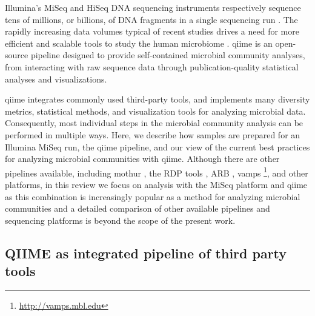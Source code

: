 Illumina's MiSeq and HiSeq DNA sequencing instruments respectively sequence tens of millions,
or billions, of DNA fragments in a single sequencing run \cite{Kuczynski2011}. The rapidly
increasing data volumes typical of recent studies drives a need for more efficient and scalable
tools to study the human microbiome \cite{Gonzalez2012}. \gls{qiime} \cite{Caporaso2010} is an
open-source pipeline designed to provide self-contained microbial community analyses, from interacting
with raw sequence data through publication-quality statistical analyses and visualizations.

\gls{qiime} integrates commonly used third-party tools, and implements many diversity metrics,
statistical methods, and visualization tools for analyzing microbial data. Consequently, most
individual steps in the microbial community analysis can be performed in multiple ways. Here, we
describe how samples are prepared for an Illumina MiSeq run, the \gls{qiime} pipeline, and our
view of the current best practices for analyzing microbial communities with \gls{qiime}. Although
there are other pipelines available, including mothur \cite{Schloss2009}, the RDP
tools \cite{Olsen1991, Olsen1992}, ARB \cite{Ludwig2004}, \gls{vamps} \footnote{\label{vampsurls}\url{http://vamps.mbl.edu}},
and other platforms, in this review we focus on analysis with the MiSeq platform and \gls{qiime}
as this combination is increasingly popular as a method for analyzing microbial communities and
a detailed comparison of other available pipelines and sequencing platforms is beyond the
scope of the present work.

\subsection{QIIME as integrated pipeline of third party tools}

